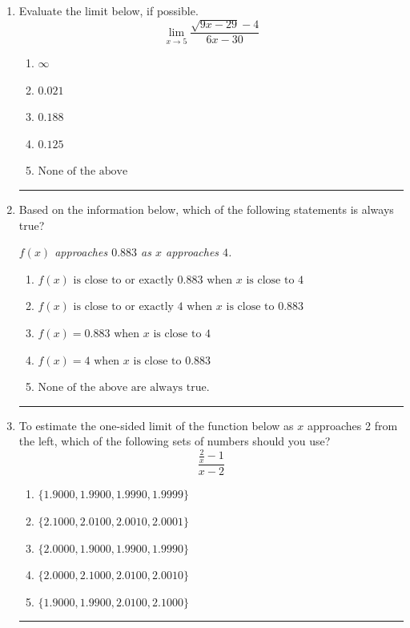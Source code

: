 \documentclass[14pt]{extbook}
\newcommand{\litem}[1]{\item#1\hspace*{-1cm}\rule{\textwidth}{0.4pt}}
\begin{document}
\begin{enumerate}
{\begin{enumerate}[label=\Alph*.]
\end{enumerate} }
\litem{
Evaluate the limit below, if possible.\[ \lim_{x \rightarrow 5} \frac{\sqrt{9x - 29} - 4}{6x - 30} \]\begin{enumerate}[label=\Alph*.]
\item \( \infty \)
\item \( 0.021 \)
\item \( 0.188 \)
\item \( 0.125 \)
\item \( \text{None of the above} \)

\end{enumerate} }
\litem{
Based on the information below, which of the following statements is always true?
\begin{center}
    \textit{ $f(x)$ approaches $0.883$ as $x$ approaches $4$. }
\end{center}
\begin{enumerate}[label=\Alph*.]
\item \( f(x) \text{ is close to or exactly } 0.883 \text{ when } x \text{ is close to } 4 \)
\item \( f(x) \text{ is close to or exactly } 4 \text{ when } x \text{ is close to } 0.883 \)
\item \( f(x) = 0.883 \text{ when } x \text{ is close to } 4 \)
\item \( f(x) = 4 \text{ when } x \text{ is close to } 0.883 \)
\item \( \text{None of the above are always true.} \)

\end{enumerate} }
\litem{
To estimate the one-sided limit of the function below as $x$ approaches 2 from the left, which of the following sets of numbers should you use?\[ \frac{\frac{2}{x} - 1}{x - 2} \]\begin{enumerate}[label=\Alph*.]
\item \( \{ 1.9000, 1.9900, 1.9990, 1.9999 \} \)
\item \( \{ 2.1000, 2.0100, 2.0010, 2.0001 \} \)
\item \( \{ 2.0000, 1.9000, 1.9900, 1.9990 \} \)
\item \( \{ 2.0000, 2.1000, 2.0100, 2.0010 \} \)
\item \( \{ 1.9000, 1.9900, 2.0100, 2.1000 \} \)


\end{enumerate}}
\end{enumerate}
\end{document}
